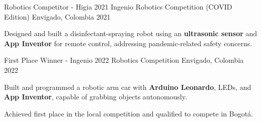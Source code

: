 \newcommand{\quotes}[1]{``#1''}

\begin{cventries}

  \cventry
  {Robotics Competitor - Higia 2021} %
  {Ingenio Robotics Competition (COVID Edition)} %
  {Envigado, Colombia} %
  {2021} %
  {
    \begin{cvitems}
      \item {Designed and built a disinfectant-spraying robot using an \textbf{ultrasonic sensor} and \textbf{App Inventor} for remote control, addressing pandemic-related safety concerns.}
    \end{cvitems}
  }

  \cventry
  {First Place Winner - Ingenio 2022} %
  {Robotics Competition} %
  {Envigado, Colombia} %
  {2022} %
  {
    \begin{cvitems}
      \item {Built and programmed a robotic arm car with \textbf{Arduino Leonardo}, LEDs, and \textbf{App Inventor}, capable of grabbing objects autonomously.}
      \item {Achieved first place in the local competition and qualified to compete in Bogotá.}
    \end{cvitems}
  }

\end{cventries}